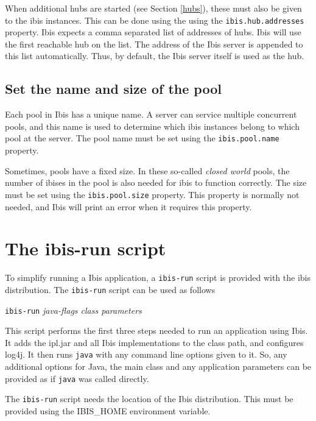 \documentclass[10pt]{article}
\begin{document}
When additional hubs are started (see Section \ref{hubs}), these must also be given to the ibis
instances. This can be done using the using the
\texttt{ibis.hub.addresses} property. Ibis expects a comma separated
list of addresses of hubs. Ibis will use the first reachable hub on the
list. The address of the Ibis server is appended to this list
automatically. Thus, by default, the Ibis server itself is used as the
hub.

\subsection{Set the name and size of the pool}

Each pool in Ibis has a unique name. A server can service multiple
concurrent pools, and this name is used to determine which ibis
instances belong to which pool at the server. The pool name must be set
using the \texttt{ibis.pool.name} property.

Sometimes, pools have a fixed size. In these so-called \emph{closed
world} pools, the number of ibises in the pool is also needed for ibis
to function correctly. The size must be set using the
\texttt{ibis.pool.size} property. This property is normally not needed,
and Ibis will print an error when it requires this property.

\section{The ibis-run script}

To simplify running a Ibis application, a \texttt{ibis-run} script is
provided with the ibis distribution. The \texttt{ibis-run} script can be
used as follows

\begin{center}
\texttt{ibis-run} \emph{java-flags class parameters}
\end{center}

This script performs the first three steps needed to run an application
using Ibis. It adds the ipl.jar and all Ibis implementations to the
class path, and configures log4j. It then runs \texttt{java} with any
command line options given to it. So, any additional options for Java,
the main class and any application parameters can be provided as if
\texttt{java} was called directly.

The \texttt{ibis-run} script needs the location of the Ibis
distribution. This must be provided using the IBIS\_HOME environment
variable.
\end{document}
